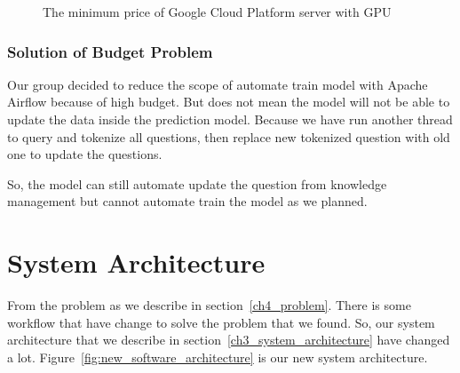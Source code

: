 \documentclass[12pt,oneside,openright,a4paper]{cpe-english-project}
\begin{document}
\begin{figure}[!h]\centering
{}
\caption{The minimum price of Google Cloud Platform server with GPU}
\label{fig:model_pattern3}
\end{figure}

\subsubsection{Solution of Budget Problem}
Our group decided to reduce the scope of automate train model with Apache Airflow because of high budget.
But does not mean the model will not be able to update the data inside the prediction model.
Because we have run another thread to query and tokenize all questions,
then replace new tokenized question with old one to update the questions.

So, the model can still automate update the question from knowledge management
but cannot automate train the model as we planned.

\section{System Architecture}
From the problem as we describe in section~\ref*{ch4_problem}.
There is some workflow that have change to solve the problem that we found.
So, our system architecture that we describe in section~\ref*{ch3_system_architecture} have changed a lot.
Figure~\ref*{fig:new_software_architecture} is our new system architecture.
\end{document}
